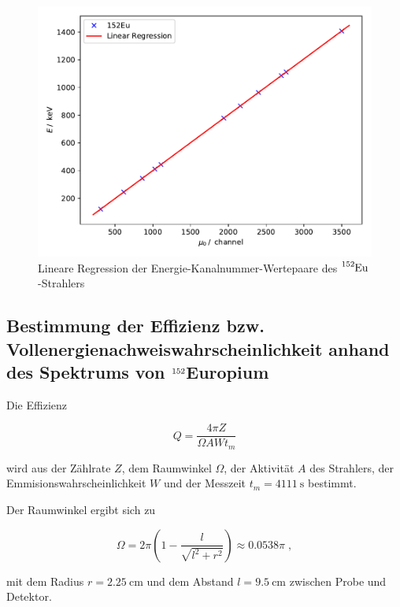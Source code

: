 \begin{figure}[H]
  \centering
  \includegraphics[scale=0.6]{content/plot5.pdf}
  \caption{Lineare Regression der Energie-Kanalnummer-Wertepaare des $\ce{^{152}Eu}$-Strahlers}
  \label{fig:plot5}
\end{figure}



\subsection{Bestimmung der Effizienz bzw. Vollenergienachweiswahrscheinlichkeit anhand des Spektrums von $\ce{^{152}}$Europium}

Die Effizienz

\begin{equation}
  Q = \frac{4 \pi Z}{\Omega A W t_m}
  \label{eqn:akt}
\end{equation}

wird aus der Zählrate  $Z$, dem Raumwinkel $\Omega$, der Aktivität $A$ des Strahlers, 
der Emmisionswahrscheinlichkeit $W$ und der Messzeit $t_m = \SI{4111}{\second}$ bestimmt.

Der Raumwinkel ergibt sich zu 

\begin{equation}
  \Omega = 2 \pi \left(1 - \frac{l}{\sqrt{l^2 + r^2}}\right) \approx \num{0.0538} \pi \; ,
\end{equation} 

mit dem Radius $r = \SI{2.25}{\centi\meter}$ und dem Abstand $l = \SI{9.5}{\centi\meter}$ zwischen Probe und Detektor.

